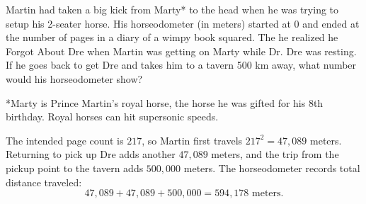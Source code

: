 Martin had taken a big kick from Marty* to the head when he was trying to setup his 2-seater horse. His horseodometer (in meters) started at 0 and ended at the number of pages in a diary of a wimpy book squared. The he realized he Forgot About Dre when Martin was getting on Marty while Dr. Dre was resting. If he goes back to get Dre and takes him to a tavern 500 km away, what number would his horseodometer show?

*Marty is Prince Martin's royal horse, the horse he was gifted for his 8th birthday. Royal horses can hit supersonic speeds.

\begin{solution}
The intended page count is $217$, so Martin first travels
$217^2=47{,}089$ meters. Returning to pick up Dre adds another
$47{,}089$ meters, and the trip from the pickup point to the tavern adds
$500{,}000$ meters. The horseodometer records total distance traveled:
\[
47{,}089+47{,}089+500{,}000=\boxed{594{,}178\text{ meters}}.
\]
\end{solution}
